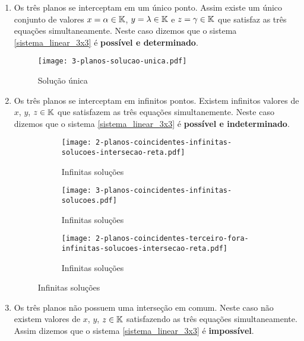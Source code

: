 \begin{enumerate}
    \item Os tr\^es planos se interceptam em um único ponto. Assim existe um único conjunto de valores $x = \alpha \in \mathbb{K}$, $y = \lambda \in \mathbb{K}$ e $z = \gamma \in \mathbb{K}$  que satisfaz as tr\^es equaç\~oes simultaneamente.  Neste caso dizemos que o sistema \eqref{sistema_linear_3x3}  é \textbf{possível e determinado}.
        \begin{figure}[h]
            \centering
            \texttt{[image: 3-planos-solucao-unica.pdf]}
                \caption{Solução única}
        \end{figure}
    \item Os tr\^es planos se interceptam em infinitos pontos. Existem infinitos valores de $x$, $y$, $z \in \mathbb{K}$ que satisfazem as tr\^es equaç\~oes simultanemente. Neste caso dizemos que o sistema \eqref{sistema_linear_3x3} é \textbf{possível e indeterminado}.
        \begin{figure}[h]
            \centering
            \begin{subfigure}{.32\textwidth}
                \centering
                \texttt{[image: 2-planos-coincidentes-infinitas-solucoes-intersecao-reta.pdf]}
                \caption{Infinitas soluç\~oes}
            \end{subfigure}
            \begin{subfigure}{.32\textwidth}
                \centering
                \texttt{[image: 3-planos-coincidentes-infinitas-solucoes.pdf]}
                \caption{Infinitas soluç\~oes}
            \end{subfigure}
            \begin{subfigure}{.32\textwidth}
                \centering
                \texttt{[image: 2-planos-coincidentes-terceiro-fora-infinitas-solucoes-intersecao-reta.pdf]}
                \caption{Infinitas soluç\~oes}
            \end{subfigure}
        \end{figure}
    \item Os tr\^es planos não possuem uma interseção em comum. Neste caso não existem valores de $x$, $y$, $z \in \mathbb{K}$  satisfazendo as tr\^es equaç\~oes simultaneamente. Assim dizemos que o sistema \eqref{sistema_linear_3x3}  é \textbf{impossível}.
        \begin{figure}[h]
            \centering
            \begin{subfigure}{.32\textwidth}

\end{subfigure}
\end{figure}
\end{enumerate}

